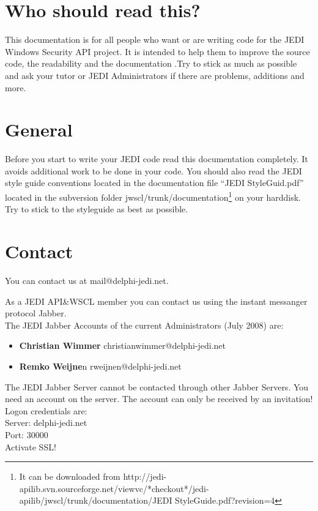 \documentclass[a4paper,oneside,10pt]{article}
\begin{document}


\section{Who should read this?}
This documentation is for all people who want or are writing code for the JEDI Windows Security API project. It is intended to help them to improve the source code, the readability and the documentation .Try to stick as much as possible and ask your tutor or JEDI Administrators if there are problems, additions and more.

\section{General}

Before you start to write your JEDI code read this documentation completely. It avoids additional work to be done in your code. You should also read the JEDI style guide conventions located in the documentation file "`JEDI StyleGuid.pdf"' located in the subversion folder jwscl/trunk/documentation\footnote{It can be downloaded from http://jedi-apilib.svn.sourceforge.net/viewvc/*checkout*/jedi-apilib/jwscl/trunk/documentation/JEDI StyleGuide.pdf?revision=4} on your harddisk. Try to stick to the styleguide as best as possible.

\section{Contact}

You can contact us at mail@delphi-jedi.net.

As a JEDI API\&WSCL member you can contact us using the instant messanger protocol Jabber.\\
The JEDI Jabber Accounts of the current Administrators (July 2008) are:
\begin{itemize}
	\item \textbf{Christian Wimmer} christianwimmer@delphi-jedi.net
	\item \textbf{Remko Weijne}n rweijnen@delphi-jedi.net
\end{itemize}

The JEDI Jabber Server cannot be contacted through other Jabber Servers. You need an account on the server. The account can only be received by an invitation!
Logon credentials are:\\
Server: delphi-jedi.net\\
Port: 30000\\
Activate SSL!\\
\end{document}

